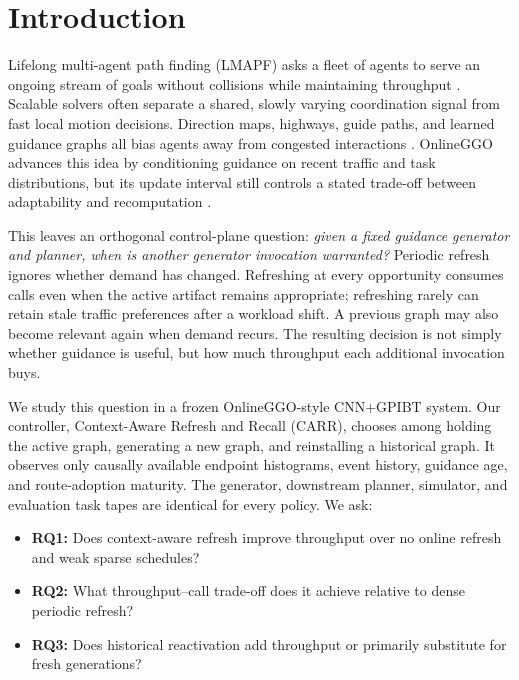 \documentclass[sigconf,review,anonymous]{acmart}
\newcommand{\carr}{\textsc{CARR}\xspace}
\begin{document}
\section{Introduction}

Lifelong multi-agent path finding (LMAPF) asks a fleet of agents to serve an
ongoing stream of goals without collisions while maintaining throughput
\cite{ma2017lifelong}. Scalable solvers often separate a shared, slowly varying
coordination signal from fast local motion decisions. Direction maps,
highways, guide paths, and learned guidance graphs all bias agents away from
congested interactions \cite{jansen2008direction,cohen2015highways,
chen2024traffic,ijcai2024p0035}. OnlineGGO advances this idea by conditioning
guidance on recent traffic and task distributions, but its update interval
still controls a stated trade-off between adaptability and recomputation
\cite{zang2025online}.

This leaves an orthogonal control-plane question: \emph{given a fixed guidance
generator and planner, when is another generator invocation warranted?}
Periodic refresh ignores whether demand has changed. Refreshing at every
opportunity consumes calls even when the active artifact remains appropriate;
refreshing rarely can retain stale traffic preferences after a workload
shift. A previous graph may also become relevant again when demand recurs.
The resulting decision is not simply whether guidance is useful, but how much
throughput each additional invocation buys.

We study this question in a frozen OnlineGGO-style CNN+GPIBT system. Our
controller, Context-Aware Refresh and Recall (\carr), chooses among holding the
active graph, generating a new graph, and reinstalling a historical graph.
It observes only causally available endpoint histograms, event history,
guidance age, and route-adoption maturity. The generator, downstream planner,
simulator, and evaluation task tapes are identical for every policy. We ask:

\begin{itemize}
  \item \textbf{RQ1:} Does context-aware refresh improve throughput over no
  online refresh and weak sparse schedules?
  \item \textbf{RQ2:} What throughput--call trade-off does it achieve relative
  to dense periodic refresh?
  \item \textbf{RQ3:} Does historical reactivation add throughput or primarily
  substitute for fresh generations?
\end{itemize}
\end{document}
